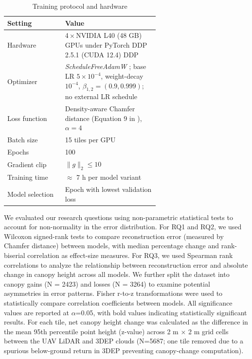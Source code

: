 \documentclass[remotesensing,article,accept,pdftex,moreauthors]{Definitions/mdpi}
\renewcommand{\hl}[1]{#1}
\begin{document}
\begin{table}[htbp]
  \centering
  \caption{Training protocol and hardware}
  \label{tab:training_protocol}
  \begin{tabular}{lp{0.62\linewidth}}
    \toprule
    \textbf{Setting} & \textbf{Value} \\
    \midrule
    Hardware      & 4\,×\,NVIDIA L40 (48 GB) GPUs under PyTorch DDP 2.5.1 (CUDA 12.4) %
 DDP \\
    Optimizer     & \textit{\hl{ScheduleFreeAdamW}} \cite{defazio_road_2024}; base LR $5\times10^{-4}$, weight-decay $10^{-4}$, $\beta_{1,2}=(0.9,0.999)$; no external LR schedule \\
    Loss function & Density-aware Chamfer distance (Equation 9 in \cite{wu_density-aware_2021}), $\alpha=4$ \\
    Batch size    & 15 tiles per GPU \\
    Epochs        & 100 \\
    Gradient clip & $\lVert g\rVert_2 \le 10$ \\
    Training time & $\approx$ 7 h per model variant \\
    Model selection & Epoch with lowest validation loss \\
    \bottomrule
  \end{tabular}
\end{table}

\vspace{-3pt}

We evaluated our research questions using non-parametric statistical tests to account for non-normality in the error distribution. For RQ1 and RQ2, we used Wilcoxon signed-rank tests to compare reconstruction error (measured by Chamfer distance) between models, with median percentage change and rank-biserial correlation as effect-size measures. For RQ3, we used Spearman rank correlations to analyze the relationship between reconstruction error and absolute change in canopy height across all models. We further split the dataset into canopy gains (N = 2423) and losses (N = 3264) to examine potential asymmetries in error patterns. Fisher r-to-z transformations were used to statistically compare correlation coefficients between models. All significance values are reported at $\alpha$=0.05, with bold values indicating statistically significant results.
For each tile, net canopy height change was calculated as the difference in the mean 95th percentile point height (z-value) across 2 m × 2 m grid cells between the UAV LiDAR and 3DEP clouds (N=5687; one tile removed due to a spurious below-ground return in 3DEP preventing canopy-change computation).
\end{document}
